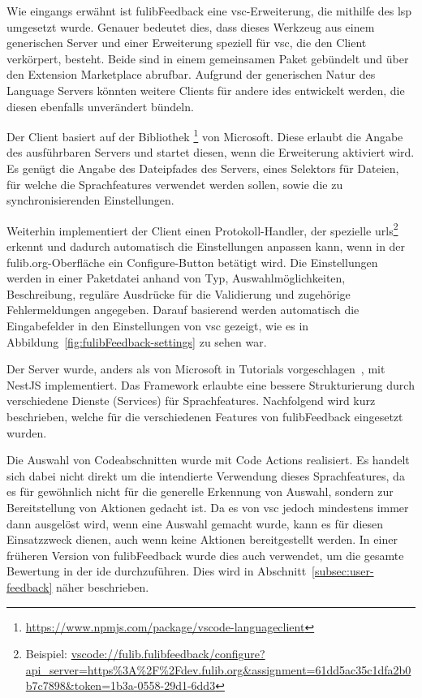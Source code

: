 Wie eingangs erwähnt ist fulibFeedback eine \ac{vsc}-Erweiterung, die mithilfe des \ac{lsp} umgesetzt wurde.
Genauer bedeutet dies, dass dieses Werkzeug aus einem generischen Server und einer Erweiterung speziell für \ac{vsc}, die den Client verkörpert, besteht.
Beide sind in einem gemeinsamen Paket gebündelt und über den Extension Marketplace abrufbar.
Aufgrund der generischen Natur des Language Servers könnten weitere Clients für andere \acp{ide} entwickelt werden, die diesen ebenfalls unverändert bündeln.

Der Client basiert auf der Bibliothek \footnote{
    \url{https://www.npmjs.com/package/vscode-languageclient}
} von Microsoft.
Diese erlaubt die Angabe des ausführbaren Servers und startet diesen, wenn die Erweiterung aktiviert wird.
Es genügt die Angabe des Dateipfades des Servers, eines Selektors für Dateien, für welche die Sprachfeatures verwendet werden sollen, sowie die zu synchronisierenden Einstellungen.

Weiterhin implementiert der Client einen Protokoll-Handler, der spezielle \acp{url}\footnote{
    Beispiel: \url{vscode://fulib.fulibfeedback/configure?api_server=https\%3A\%2F\%2Fdev.fulib.org&assignment=61dd5ac35c1dfa2b0b7c7898&token=1b3a-0558-29d1-6dd3}
} erkennt und dadurch automatisch die Einstellungen anpassen kann, wenn in der fulib.org-Oberfläche ein Configure-Button betätigt wird.
Die Einstellungen werden in einer Paketdatei anhand von Typ, Auswahlmöglichkeiten, Beschreibung, reguläre Ausdrücke für die Validierung und zugehörige Fehlermeldungen angegeben.
Darauf basierend werden automatisch die Eingabefelder in den Einstellungen von \ac{vsc} gezeigt, wie es in Abbildung~\ref{fig:fulibFeedback-settings} zu sehen war.

Der Server wurde, anders als von Microsoft in Tutorials vorgeschlagen~\cite{vsc-language-server-guide}, mit NestJS implementiert.
Das Framework erlaubte eine bessere Strukturierung durch verschiedene Dienste (Services) für Sprachfeatures.
Nachfolgend wird kurz beschrieben, welche für die verschiedenen Features von fulibFeedback eingesetzt wurden.

Die Auswahl von Codeabschnitten wurde mit Code Actions realisiert.
Es handelt sich dabei nicht direkt um die intendierte Verwendung dieses Sprachfeatures, da es für gewöhnlich nicht für die generelle Erkennung von Auswahl, sondern zur Bereitstellung von Aktionen gedacht ist.
Da es von \ac{vsc} jedoch mindestens immer dann ausgelöst wird, wenn eine Auswahl gemacht wurde, kann es für diesen Einsatzzweck dienen, auch wenn keine Aktionen bereitgestellt werden.
In einer früheren Version von fulibFeedback wurde dies auch verwendet, um die gesamte Bewertung in der \ac{ide} durchzuführen.
Dies wird in Abschnitt~\ref{subsec:user-feedback} näher beschrieben.

